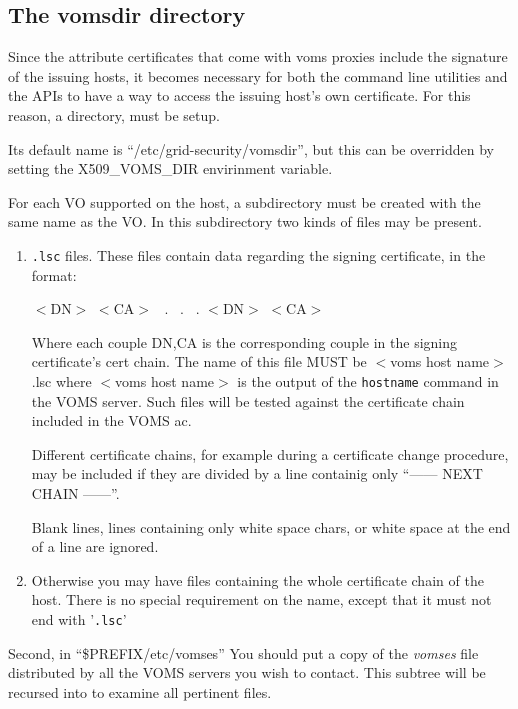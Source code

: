 \documentclass[a4paper]{book}
\begin{document}
\subsection{The vomsdir directory}
Since the attribute certificates that come with voms proxies include
the signature of the issuing hosts, it becomes necessary for both the
command line utilities and the APIs to have a way to access the
issuing host's own certificate.  For this reason, a directory, must be
setup.

Its default name is ``/etc/grid-security/vomsdir'', but this can be
overridden by setting the X509\_VOMS\_DIR envirinment variable.

For each VO supported on the host, a subdirectory must be created with
the same name as the VO.  In this subdirectory two kinds of files may
be present.

\begin{enumerate}
\item \texttt{\*.lsc} files.  These files contain data regarding the
signing certificate, in the format:

$<$DN$>$\newline
$<$CA$>$\newline
\ .\newline
\ .\newline
\ .\newline
$<$DN$>$\newline
$<$CA$>$\newline

Where each couple DN,CA is the corresponding couple in the signing
certificate's cert chain. The name of this file MUST be $<$voms host
name$>$.lsc where $<$voms host name$>$ is the output of the
\texttt{hostname} command in the VOMS server.  Such files will be
tested against the certificate chain included in the VOMS ac.

Different certificate chains, for example during a certificate change
procedure, may be included if they are divided by a line containig
only ``------ NEXT CHAIN ------''.

Blank lines, lines containing only white space chars, or white space
at the end of a line are ignored.


\item Otherwise you may have files containing the whole certificate
chain of the host.  There is no special requirement on the name,
except that it must not end with '\texttt{.lsc}'
\end{enumerate}

Second, in ``\$PREFIX/etc/vomses'' You should put a copy of the
\emph{vomses} file distributed by all the VOMS servers you wish to
contact.  This subtree will be recursed into to examine all pertinent
files.
\end{document}

